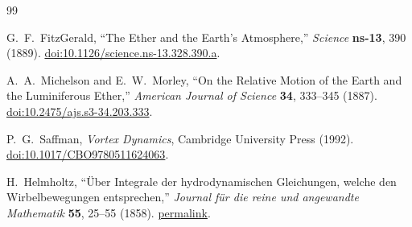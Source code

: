 \begin{thebibliography}{99}

G.~F.~FitzGerald,
``The Ether and the Earth's Atmosphere,''
\textit{Science} \textbf{ns-13}, 390 (1889).
\href{https://doi.org/10.1126/science.ns-13.328.390.a}{doi:10.1126/science.ns-13.328.390.a}.

A.~A.~Michelson and E.~W.~Morley,
``On the Relative Motion of the Earth and the Luminiferous Ether,''
\textit{American Journal of Science} \textbf{34}, 333--345 (1887).
\href{https://doi.org/10.2475/ajs.s3-34.203.333}{doi:10.2475/ajs.s3-34.203.333}.

P.~G.~Saffman,
\textit{Vortex Dynamics},
Cambridge University Press (1992).
\href{https://doi.org/10.1017/CBO9780511624063}{doi:10.1017/CBO9780511624063}.

H.~Helmholtz,
``\"Uber Integrale der hydrodynamischen Gleichungen, welche den Wirbelbewegungen entsprechen,''
\textit{Journal f\"ur die reine und angewandte Mathematik} \textbf{55}, 25--55 (1858).
\href{https://eudml.org/doc/147755}{permalink}.

\end{thebibliography}
